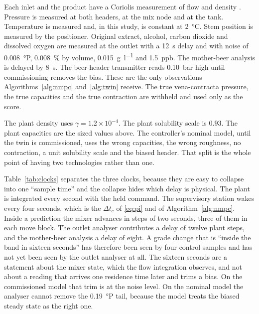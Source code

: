 Each inlet and the product have a Coriolis measurement of flow and density \citep{wang2014}. Pressure is measured at both headers, at the mix node and at the tank. Temperature is measured and, in this study, is constant at \SI{2}{\celsius}. Stem position is measured by the positioner. Original extract, alcohol, carbon dioxide and dissolved oxygen are measured at the outlet with a \SI{12}{\second} delay and with noise of \SI{0.008}{\degree}P, \SI{0.008}{\percent} by volume, \SI{0.015}{\gram\per\litre} and \SI{1.5}{ppb}. The mother-beer analysis is delayed by \SI{8}{\second}. The beer-header transmitter reads \SI{0.10}{bar} high until commissioning removes the bias. These are the only observations Algorithms~\ref{alg:nmpc} and~\ref{alg:twin} receive. The true vena-contracta pressure, the true capacities and the true contraction are withheld and used only as the score.

The plant density uses $\gamma = 1.2\times 10^{-4}$. The plant solubility scale is $0.93$. The plant capacities are the sized values above. The controller's nominal model, until the twin is commissioned, uses the wrong capacities, the wrong roughness, no contraction, a unit solubility scale and the biased header. That split is the whole point of having two technologies rather than one.

Table~\ref{tab:clocks} separates the three clocks, because they are easy to collapse into one ``sample time'' and the collapse hides which delay is physical. The plant is integrated every second with the held command. The supervisory station wakes every four seconds, which is the $\Delta t_c$ of \eqref{eq:pi} and of Algorithm~\ref{alg:nmpc}. Inside a prediction the mixer advances in steps of two seconds, three of them in each move block. The outlet analyser contributes a delay of twelve plant steps, and the mother-beer analysis a delay of eight. A grade change that is ``inside the band in sixteen seconds'' has therefore been seen by four control samples and has not yet been seen by the outlet analyser at all. The sixteen seconds are a statement about the mixer state, which the flow integration observes, and not about a reading that arrives one residence time later and trims a bias. On the commissioned model that trim is at the noise level. On the nominal model the analyser cannot remove the \SI{0.19}{\degree}P tail, because the model treats the biased steady state as the right one.

